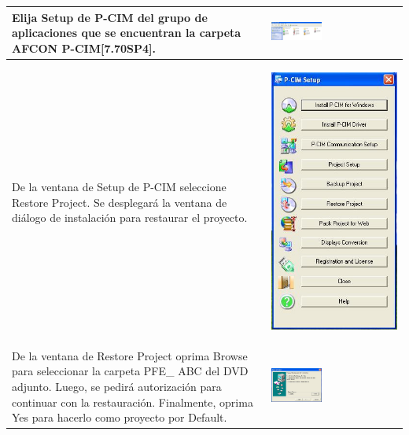 \begin{table}[H]
\small
\centering
\renewcommand*{\arraystretch}{0.3}
\begin{tabular}{*{2}{m{}}}
\hline
  Elija Setup de P-CIM del grupo de aplicaciones que se encuentran la carpeta 
  AFCON P-CIM[7.70SP4]. 
  &\begin{center}
    \includegraphics[width=0.4\textwidth]
	{Cap5-SCADA/images/Dibujo1.JPG}
  \end{center}\\
\hline
  De la ventana de Setup de P-CIM seleccione Restore Project.
  Se desplegará la ventana de diálogo de instalación para restaurar el proyecto.
  &\begin{center}
    \includegraphics[height=0.3\textwidth]
	{Cap5-SCADA/images/PcimSetup.jpeg}
  \end{center}\\
\hline
  De la ventana de Restore Project oprima Browse para seleccionar la carpeta 
  PFE\_ ABC del DVD adjunto. Luego, se pedirá autorización para continuar con 
  la restauración. Finalmente, oprima Yes para hacerlo como proyecto por 
  Default.
  &\begin{center}
    \includegraphics[width=0.4\textwidth]
	{Anexos/images/restoreProject.JPG}
  \end{center}\\
\hline
\end{tabular}
\end{table}

